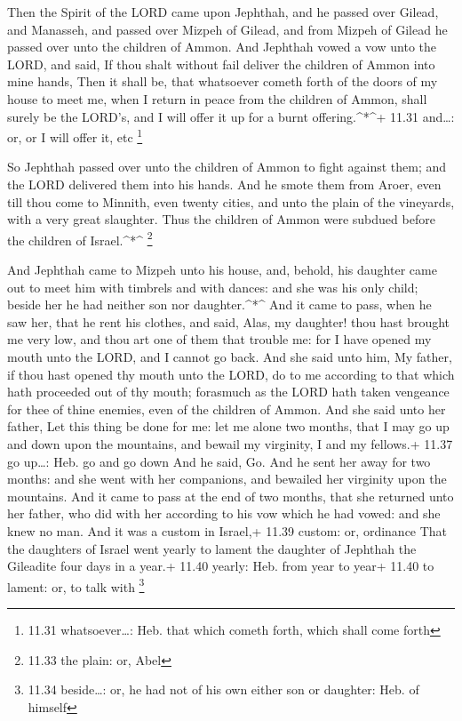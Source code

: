  Then the Spirit of the LORD came upon Jephthah, and he
passed over Gilead, and Manasseh, and passed over Mizpeh of Gilead, and
from Mizpeh of Gilead he passed over unto the children of Ammon.
 And Jephthah vowed a vow unto the LORD, and said, If thou
shalt without fail deliver the children of Ammon into mine hands,
 Then it shall be, that whatsoever cometh forth of the
doors of my house to meet me, when I return in peace from the children
of Ammon, shall surely be the LORD's, and I will offer it up for a burnt
offering.\^{}*\^{}+ 11.31 and\ldots: or, or I will offer it, etc
\footnote{11.31 whatsoever\ldots: Heb. that which cometh forth, which
  shall come forth}

 So Jephthah passed over unto the children of Ammon to
fight against them; and the LORD delivered them into his hands.
 And he smote them from Aroer, even till thou come to
Minnith, even twenty cities, and unto the plain of the vineyards, with a
very great slaughter. Thus the children of Ammon were subdued before the
children of Israel.\^{}*\^{} \footnote{11.33 the plain: or, Abel}

 And Jephthah came to Mizpeh unto his house, and, behold,
his daughter came out to meet him with timbrels and with dances: and she
was his only child; beside her he had neither son nor daughter.\^{}*\^{}
 And it came to pass, when he saw her, that he rent his
clothes, and said, Alas, my daughter! thou hast brought me very low, and
thou art one of them that trouble me: for I have opened my mouth unto
the LORD, and I cannot go back.  And she said unto him, My
father, if thou hast opened thy mouth unto the LORD, do to me according
to that which hath proceeded out of thy mouth; forasmuch as the LORD
hath taken vengeance for thee of thine enemies, even of the children of
Ammon.  And she said unto her father, Let this thing be
done for me: let me alone two months, that I may go up and down upon the
mountains, and bewail my virginity, I and my fellows.+ 11.37 go
up\ldots: Heb. go and go down  And he said, Go. And he sent
her away for two months: and she went with her companions, and bewailed
her virginity upon the mountains.  And it came to pass at
the end of two months, that she returned unto her father, who did with
her according to his vow which he had vowed: and she knew no man. And it
was a custom in Israel,+ 11.39 custom: or, ordinance  That
the daughters of Israel went yearly to lament the daughter of Jephthah
the Gileadite four days in a year.+ 11.40 yearly: Heb. from year to
year+ 11.40 to lament: or, to talk with \footnote{11.34 beside\ldots:
  or, he had not of his own either son or daughter: Heb. of himself}

